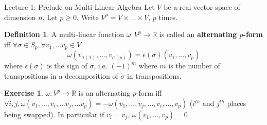 \documentclass[10pt]{article}
\theoremstyle{plain}
\theoremstyle{definition}
\newtheorem{defn}[thm]{Definition} %
\newtheorem{exercise}[thm]{Exercise}
\newcommand{\myand}{\text{ and }}
\newcommand{\Real}{\mathbb{R}}
\begin{document}
\begin{section}{Lecture 1: Prelude on Multi-Linear Algebra}
Let $V$ be a real vector space of dimension $n$. Let $p\geq0$. Write $V^p = V\times ...\times V$, $p$ times.
\begin{defn}
A multi-linear function $\omega : V^p \to \Real$ is called an \textbf{alternating $p$-form} iff $\forall \sigma\in S_p, \forall v_1,...v_p \in V,$ $$\omega(v_{\sigma(1)},...,v_{\sigma(p)}) = \epsilon(\sigma) (v_1,...,v_p)$$
where $\epsilon(\sigma)$ is the sign of $\sigma$, i.e. $(-1)^m$ where $m$ is the number of transpositions in a decomposition of $\sigma$ in transpositions.
\end{defn}
\begin{exercise}
$\omega : V^p \to \Real$ is an alternating $p$-form iff $\forall i,j, \omega(v_1,...,v_i,...v_j,...v_p) =  -\omega(v_1,...,v_j,...,v_i,...,v_p)$ ($i^{th} \myand j^{th}$ places being swapped). In particular if $v_i = v_j$, $\omega(v_1,...,v_p) = 0$
\end{exercise}




\end{section}
\end{document}
